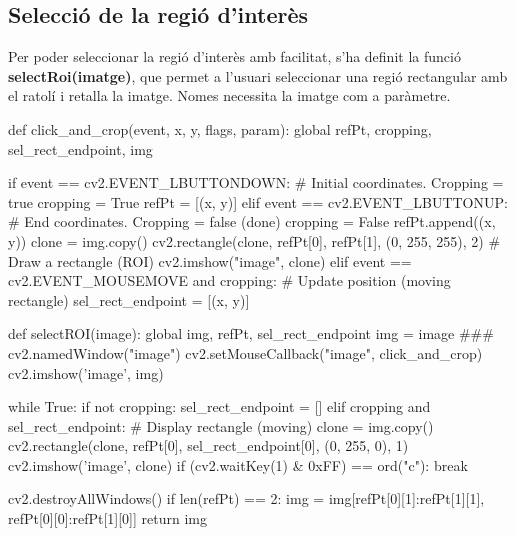 	\subsection{Selecció de la regió d'interès}
		Per poder seleccionar la regió d'interès amb facilitat, s'ha definit la funció \textbf{selectRoi(imatge)}, que permet a l'usuari seleccionar una regió rectangular amb el ratolí i retalla la imatge.
		Nomes necessita la imatge com a paràmetre.\\
		\begin{python}
def click_and_crop(event, x, y, flags, param):
	global refPt, cropping, sel_rect_endpoint, img
 
	if event == cv2.EVENT_LBUTTONDOWN:	# Initial coordinates. Cropping = true
		cropping = True
		refPt = [(x, y)] 
	elif event == cv2.EVENT_LBUTTONUP:	# End coordinates. Cropping = false (done)
		cropping = False
		refPt.append((x, y)) 
		clone = img.copy()
		cv2.rectangle(clone, refPt[0], refPt[1], (0, 255, 255), 2)	# Draw a rectangle (ROI)
		cv2.imshow("image", clone)
	elif event == cv2.EVENT_MOUSEMOVE and cropping:	# Update position (moving rectangle)
		sel_rect_endpoint = [(x, y)]

def selectROI(image):
	global img, refPt, sel_rect_endpoint
	img = image ###
	cv2.namedWindow("image")
	cv2.setMouseCallback("image", click_and_crop)
	cv2.imshow('image', img)

	while True:
		if not cropping:
			sel_rect_endpoint = []
		elif cropping and sel_rect_endpoint:	# Display rectangle (moving)
			clone = img.copy()
			cv2.rectangle(clone, refPt[0], sel_rect_endpoint[0], (0, 255, 0), 1)
			cv2.imshow('image', clone)
		if (cv2.waitKey(1) & 0xFF) == ord("c"):
			break

	cv2.destroyAllWindows()
	if len(refPt) == 2:
		img = img[refPt[0][1]:refPt[1][1], refPt[0][0]:refPt[1][0]]
	return img
		\end{python}
